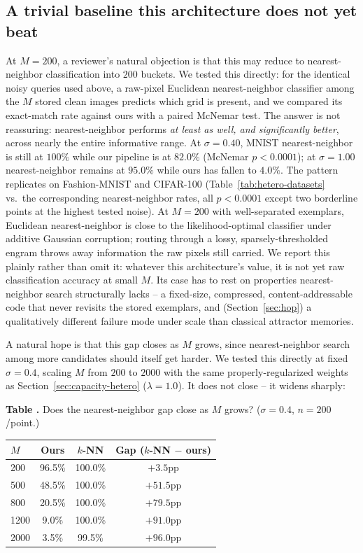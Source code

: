 \documentclass[11pt]{article}
\newcommand{\toprule}{\hline\hline}
\newcommand{\midrule}{\hline}
\newcommand{\bottomrule}{\hline\hline}
\begin{document}
\subsection{A trivial baseline this architecture does not yet beat}
\label{sec:knn-baseline}

At $M{=}200$, a reviewer's natural objection is that this may reduce to nearest-neighbor
classification into $200$ buckets. We tested this directly: for the identical noisy queries
used above, a raw-pixel Euclidean nearest-neighbor classifier among the $M$ stored clean images
predicts which grid is present, and we compared its exact-match rate against ours with a paired
McNemar test. The answer is not reassuring: nearest-neighbor performs \emph{at least as well,
and significantly better}, across nearly the entire informative range. At $\sigma{=}0.40$,
MNIST nearest-neighbor is still at $100\%$ while our pipeline is at $82.0\%$ (McNemar
$p<0.0001$); at $\sigma{=}1.00$ nearest-neighbor remains at $95.0\%$ while ours has fallen to
$4.0\%$. The pattern replicates on Fashion-MNIST and CIFAR-100 (Table~\ref{tab:hetero-datasets}
vs.\ the corresponding nearest-neighbor rates, all $p<0.0001$ except two borderline points at
the highest tested noise). At $M{=}200$ with well-separated exemplars, Euclidean
nearest-neighbor is close to the likelihood-optimal classifier under additive Gaussian
corruption; routing through a lossy, sparsely-thresholded engram throws away information the
raw pixels still carried. We report this plainly rather than omit it: whatever this
architecture's value, it is not yet raw classification accuracy at small $M$. Its case has to
rest on properties nearest-neighbor search structurally lacks -- a fixed-size, compressed,
content-addressable code that never revisits the stored exemplars, and (Section~\ref{sec:hop})
a qualitatively different failure mode under scale than classical attractor memories.

A natural hope is that this gap closes as $M$ grows, since nearest-neighbor search among more
candidates should itself get harder. We tested this directly at fixed $\sigma{=}0.4$, scaling
$M$ from $200$ to $2000$ with the same properly-regularized weights as
Section~\ref{sec:capacity-hetero} ($\lambda{=}1.0$). It does not close -- it widens sharply:

\label{tab:knn-vs-M}
\noindent\textbf{Table \thetable.} Does the nearest-neighbor gap close as $M$ grows? ($\sigma{=}0.4$,
$n{=}200$/point.)
\begin{center}
\begin{tabular}{lccc}
\toprule
$M$ & Ours & $k$-NN & Gap ($k$-NN $-$ ours) \\
\midrule
200  & 96.5\% & 100.0\% & $+3.5$pp \\
500  & 48.5\% & 100.0\% & $+51.5$pp \\
800  & 20.5\% & 100.0\% & $+79.5$pp \\
1200 & 9.0\%  & 100.0\% & $+91.0$pp \\
2000 & 3.5\%  & 99.5\%  & $+96.0$pp \\
\bottomrule
\end{tabular}
\end{center}
\end{document}
